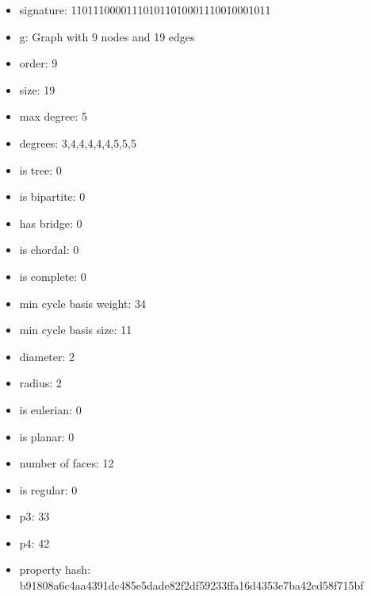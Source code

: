 \newpage
\begin{figure}
\end{figure}
\begin{itemize}
\item signature: 110111000011101011010001110010001011
\item g: Graph with 9 nodes and 19 edges
\item order: 9
\item size: 19
\item max degree: 5
\item degrees: 3,4,4,4,4,4,5,5,5
\item is tree: 0
\item is bipartite: 0
\item has bridge: 0
\item is chordal: 0
\item is complete: 0
\item min cycle basis weight: 34
\item min cycle basis size: 11
\item diameter: 2
\item radius: 2
\item is eulerian: 0
\item is planar: 0
\item number of faces: 12
\item is regular: 0
\item p3: 33
\item p4: 42
\item property hash: b91808a6c4aa4391dc485e5dade82f2df59233ffa16d4353e7ba42ed58f715bf
\end{itemize}
